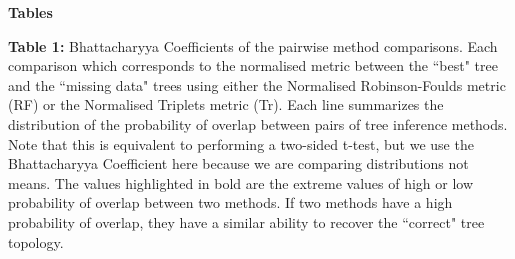 \documentclass[12pt,letterpaper]{article}
\begin{document}
\newpage
\begin{landscape}

\noindent
\textbf{Tables}\\
\bigskip

\noindent
\textbf{Table 1:} Bhattacharyya Coefficients of the pairwise method comparisons.
Each comparison which corresponds to the normalised metric between the ``best" tree and the ``missing data" trees using either the Normalised Robinson-Foulds metric (RF) or the Normalised Triplets metric (Tr). Each line summarizes the distribution of the probability of overlap between pairs of tree inference methods. Note that this is equivalent to performing a two-sided t-test, but we use the Bhattacharyya Coefficient here because we are comparing distributions not means. The values highlighted in bold are the extreme values of high or low probability of overlap between two methods. If two methods have a high probability of overlap, they have a similar ability to recover the ``correct" tree topology.\\


\end{landscape}
\end{document}
